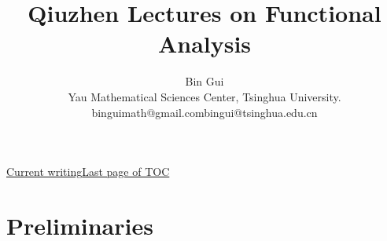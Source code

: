 \documentclass[12pt,b5paper,notitlepage]{article}
\title{Qiuzhen Lectures on Functional Analysis}
\author{{\sc Bin Gui}
	\\
	{\small \sc Yau Mathematical Sciences Center, Tsinghua University.}\\
	{\small binguimath@gmail.com\qquad bingui@tsinghua.edu.cn}
}
\theoremstyle{definition}
\theoremstyle{plain}
\numberwithin{equation}{section}
\begin{document}
\sloppy %
	\setcounter{page}{1}



	









	
	\maketitle
\small   
\qquad 

\hyperlink{current}{Current writing}\qquad \hyperlink{page.2}{Last page of TOC}












	


\normalsize
\tableofcontents






\newpage



\section{Preliminaries}
\end{document}
